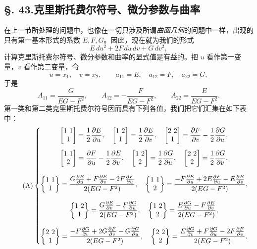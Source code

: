 \subsection*{\S. 43.\quad 克里斯托费尔符号、微分参数与曲率}

在上一节所处理的问题中，也像在一切只涉及所谓\emph{曲面几何}的问题中一样，出现的只有第一基本形式的系数 \(E,F,G\)。因此，现在就为我们的形式
\[
 E\,du^2+2F\,du\,dv+G\,dv^2,
\]
计算克里斯托费尔符号、微分参数和曲率的显式值是有益的。把 \(u\) 看作第一变量，\(v\) 看作第二变量，令
\[
 u=x_1,
 \quad v=x_2,
 \qquad
 a_{11}=E,
 \quad a_{12}=F,
 \quad a_{22}=G,
\]
于是
\[
 A_{11}=\frac{G}{EG-F^2},\qquad
 A_{12}=-\frac{F}{EG-F^2},\qquad
 A_{22}=\frac{E}{EG-F^2}.
\]
第一类和第二类克里斯托费尔符号因而具有下列各值，我们把它们汇集在如下表中：
\begingroup\small
\begin{equation}\tag{A}
\left\{
\begin{gathered}
\left[\begin{matrix}1\ 1\\ 1\end{matrix}\right]=\frac12\frac{\partial E}{\partial u},\quad
\left[\begin{matrix}1\ 2\\ 1\end{matrix}\right]=\frac12\frac{\partial E}{\partial v},\quad
\left[\begin{matrix}2\ 2\\ 1\end{matrix}\right]=\frac{\partial F}{\partial v}-\frac12\frac{\partial G}{\partial u},\\[0.5em]
\left[\begin{matrix}1\ 1\\ 2\end{matrix}\right]=\frac{\partial F}{\partial u}-\frac12\frac{\partial E}{\partial v},\quad
\left[\begin{matrix}1\ 2\\ 2\end{matrix}\right]=\frac12\frac{\partial G}{\partial u},\quad
\left[\begin{matrix}2\ 2\\ 2\end{matrix}\right]=\frac12\frac{\partial G}{\partial v},\\[0.8em]
\left\{\begin{matrix}1\ 1\\ 1\end{matrix}\right\}=\frac{G\frac{\partial E}{\partial u}+F\frac{\partial E}{\partial v}-2F\frac{\partial F}{\partial u}}{2(EG-F^2)},\quad
\left\{\begin{matrix}1\ 1\\ 2\end{matrix}\right\}=\frac{-F\frac{\partial E}{\partial u}+2E\frac{\partial F}{\partial u}-E\frac{\partial E}{\partial v}}{2(EG-F^2)},\\[0.8em]
\left\{\begin{matrix}1\ 2\\ 1\end{matrix}\right\}=\frac{G\frac{\partial E}{\partial v}-F\frac{\partial G}{\partial u}}{2(EG-F^2)},\quad
\left\{\begin{matrix}1\ 2\\ 2\end{matrix}\right\}=\frac{E\frac{\partial G}{\partial u}-F\frac{\partial E}{\partial v}}{2(EG-F^2)},\\[0.8em]
\left\{\begin{matrix}2\ 2\\ 1\end{matrix}\right\}=\frac{-F\frac{\partial G}{\partial v}+2G\frac{\partial F}{\partial v}-G\frac{\partial G}{\partial u}}{2(EG-F^2)},\quad
\left\{\begin{matrix}2\ 2\\ 2\end{matrix}\right\}=\frac{E\frac{\partial G}{\partial v}+F\frac{\partial G}{\partial u}-2F\frac{\partial F}{\partial v}}{2(EG-F^2)}.
\end{gathered}
\right.
\end{equation}
\endgroup

